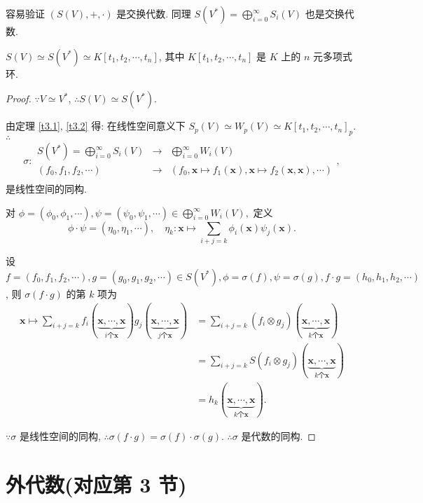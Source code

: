 \documentclass{ctexart}
\begin{document}
容易验证 $(S(V),+,\cdot)$ 是交换代数. 同理 $S(V^*)=\bigoplus\limits_{i=0}^\infty S_i(V)$ 也是交换代数.
\begin{theorem}
    $S(V)\simeq S(V^*)\simeq K[t_1,t_2,\cdots,t_n]$, 其中 $K[t_1,t_2,\cdots,t_n]$ 是 $K$ 上的 $n$ 元多项式环.
\end{theorem}
\begin{proof}
    $\because V\simeq V^*$, $\therefore S(V)\simeq S(V^*)$.

    由定理 \ref{t3.1}, \ref{t3.2} 得: 在线性空间意义下 $S_p(V)\simeq W_p(V)\simeq K[t_1,t_2,\cdots,t_n]_p$. $\therefore$
    \[\sigma:\begin{array}{rcl}
        S(V^*)=\bigoplus\limits_{i=0}^\infty S_i(V) & \rightarrow & \bigoplus\limits_{i=0}^\infty W_i(V) \\
        (f_0,f_1,f_2,\cdots) & \rightarrow & (f_0,\boldsymbol{x}\mapsto f_1(\boldsymbol{x}),\boldsymbol{x}\mapsto f_2(\boldsymbol{x},\boldsymbol{x}),\cdots) \\
    \end{array},\]
    是线性空间的同构.

    对 $\phi=(\phi_0,\phi_1,\cdots),\psi=(\psi_0,\psi_1,\cdots)\in\bigoplus\limits_{i=0}^\infty W_i(V),$ 定义
    \[\phi\cdot\psi=(\eta_0,\eta_1,\cdots),\quad\eta_k:\boldsymbol{x}\mapsto\sum\limits_{i+j=k}\phi_i(\boldsymbol{x})\psi_j(\boldsymbol{x}).\]

    设 $f=(f_0,f_1,f_2,\cdots),g=(g_0,g_1,g_2,\cdots)\in S(V^*),\phi=\sigma(f),\psi=\sigma(g),f\cdot g=(h_0,h_1,h_2,\cdots)$, 则 $\sigma(f\cdot g)$ 的第 $k$ 项为
    \begin{align*}
        \boldsymbol{x}\mapsto\sum\limits_{i+j=k}f_i(\underbrace{\boldsymbol{x},\cdots,\boldsymbol{x}}_{i\text{个}\boldsymbol{x}})g_j(\underbrace{\boldsymbol{x},\cdots,\boldsymbol{x}}_{j\text{个}\boldsymbol{x}}) & =\sum\limits_{i+j=k}(f_i\otimes g_j)(\underbrace{\boldsymbol{x},\cdots,\boldsymbol{x}}_{k\text{个}\boldsymbol{x}}) \\
        & =\sum\limits_{i+j=k}S(f_i\otimes g_j)(\underbrace{\boldsymbol{x},\cdots,\boldsymbol{x}}_{k\text{个}\boldsymbol{x}}) \\
        & =h_k(\underbrace{\boldsymbol{x},\cdots,\boldsymbol{x}}_{k\text{个}\boldsymbol{x}}).
    \end{align*}

    $\because\sigma$ 是线性空间的同构, $\therefore\sigma(f\cdot g)=\sigma(f)\cdot\sigma(g)$. $\therefore\sigma$ 是代数的同构.
\end{proof}
\section{外代数(对应第 3 节)}
\end{document}

